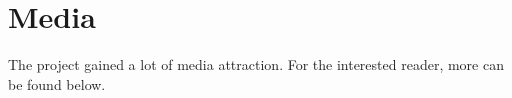 \chapter*{Media}

The project gained a lot of media attraction. For the interested reader, more can be found below.
